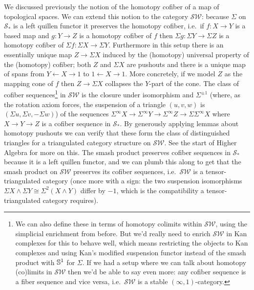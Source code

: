 We discussed previously the notion of the homotopy cofiber of a map of topological spaces. We can extend this notion to the category \(\mathcal{SW}\): because \(\Sigma\) on \(\mathcal{S}_*\) is a left quillen functor it preserves the homotopy cofiber, i.e.~if \(f : X \to Y\) is a based map and \(g : Y \to Z\) is a homotopy cofiber of \(f\) then \(\Sigma g : \Sigma Y \to \Sigma Z\) is a homotopy cofiber of \(\Sigma f : \Sigma X \to \Sigma Y\). Furthermore in this setup there is an essentially unique map \(Z \to \Sigma X\) induced by the (homotopy) universal property of the (homotopy) cofiber; both \(Z\) and \(\Sigma X\) are pushouts and there is a unique map of spans from \(Y \leftarrow X \to 1\) to \(1 \leftarrow X \to 1\). More concretely, if we model \(Z\) as the mapping cone of \(f\) then \(Z \to \Sigma X\) collapses the \(Y\)-part of the cone. The class of cofiber sequences\footnote{We can also define these in terms of homotopy colimits within \(\mathcal{SW}\), using the simplicial enrichment from before. But we'd really need to enrich \(\mathcal{SW}\) in Kan complexes for this to behave well, which means restricting the objects to Kan complexes and using Kan's modified suspension functor instead of the smash product with \(\S^1\) for \(\Sigma\). If we had a setup where we can talk about homotopy (co)limits in \(\mathcal{SW}\) then we'd be able to say even more: any cofiber sequence is a fiber sequence and vice versa, i.e.~\(\mathcal{SW}\) is a stable \((\infty, 1)\)-category.} in \(\mathcal{SW}\) is the closure under isomorphism and \(\Sigma^{\pm 1}\) (where, as the rotation axiom forces, the suspension of a triangle \((u, v, w)\) is \((\Sigma u, \Sigma v, -\Sigma w)\)) of the sequences \(\Sigma^\infty X \to \Sigma^\infty Y \to \Sigma^\infty Z \to \Sigma \Sigma^\infty X\) where \(X \to Y \to Z\) is a cofiber sequence in \(\mathcal{S}_*\). By generously applying lemmas about homotopy pushouts we can verify that these form the class of distinguished triangles for a triangulated category structure on \(\mathcal{SW}\). See the start of Higher Algebra for more on this. The smash product preserves cofiber sequences in \(\mathcal{S}_*\) because it is a left quillen functor, and we can plumb this along to get that the smash product on \(\mathcal{SW}\) preserves its cofiber sequences, i.e.~\(\mathcal{SW}\) is a tensor-triangulated category (once more with a sign: the two suspension isomorphisms \(\Sigma X \wedge \Sigma Y \cong \Sigma^2 (X \wedge Y)\) differ by \(-1\), which is the compatibility a tensor-triangulated category requires).
